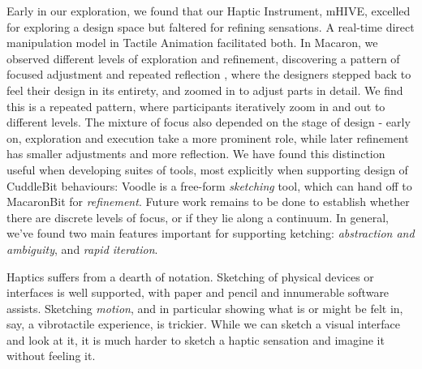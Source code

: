 Early in our exploration, we found that our Haptic Instrument, mHIVE, excelled for exploring a design space but faltered for refining sensations.
A real-time direct manipulation model in Tactile Animation facilitated both.
In Macaron, we observed different levels of exploration and refinement, discovering a pattern of focused adjustment and repeated reflection \cite{Schon1982}, where the designers stepped back to feel their design in its entirety, and zoomed in to adjust parts in detail.
We find this is a repeated pattern, where participants iteratively zoom in and out to different levels.
The mixture of focus also depended on the stage of design - early on, exploration and execution take a more prominent role, while later refinement has smaller adjustments and more reflection.
We have found this distinction useful when developing suites of tools, most explicitly when supporting design of CuddleBit behaviours: 
Voodle is a free-form \emph{sketching} tool, which can hand off to MacaronBit for \emph{refinement}.
Future work remains to be done to establish whether there are discrete levels of focus, or if they lie along a continuum.
In general, we've found two main features important for supporting ketching: \textit{abstraction and ambiguity}, and \textit{rapid iteration}.



%


	Haptics suffers from a dearth of notation.
	Sketching of physical devices or interfaces is well supported, with paper and pencil and innumerable software assists.
	Sketching \textit{motion}, and in particular showing what is or might be felt in, say, a vibrotactile experience, is  trickier.
	While we can sketch a visual interface and look at it, it is much harder to sketch a haptic sensation and imagine it without feeling it.

